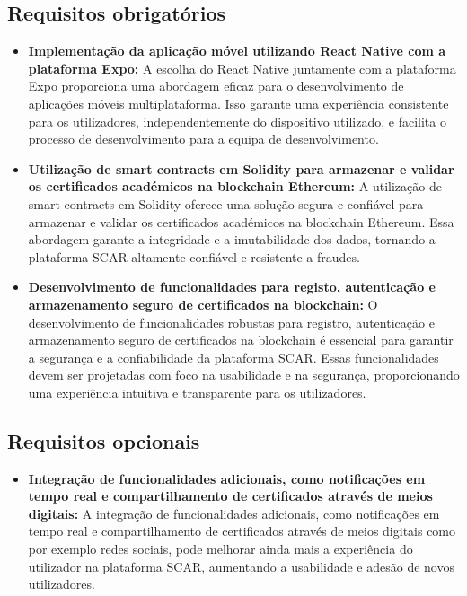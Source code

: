 \documentclass[10pt]{article}
\begin{document}
\subsection*{Requisitos obrigatórios}

\begin{itemize}

    \item\textbf{Implementação da aplicação móvel utilizando React Native com a plataforma Expo:} A escolha do React Native
          juntamente com a plataforma Expo proporciona uma abordagem eficaz para o desenvolvimento de aplicações móveis
          multiplataforma. Isso garante uma experiência consistente para os utilizadores, independentemente do dispositivo
          utilizado, e facilita o processo de desenvolvimento para a equipa de desenvolvimento.

    \item\textbf{Utilização de smart contracts em Solidity para armazenar e validar os certificados académicos na blockchain
              Ethereum:} A utilização de smart contracts em Solidity oferece uma solução segura e confiável para armazenar
          e validar os certificados académicos na blockchain Ethereum. Essa abordagem garante a integridade e a
          imutabilidade dos dados, tornando a plataforma SCAR altamente confiável e resistente a fraudes.

    \item\textbf{Desenvolvimento de funcionalidades para registo, autenticação e armazenamento seguro de certificados na
              blockchain:} O desenvolvimento de funcionalidades robustas para registro, autenticação e armazenamento seguro
          de certificados na blockchain é essencial para garantir a segurança e a confiabilidade da plataforma SCAR.\@
          Essas funcionalidades devem ser projetadas com foco na usabilidade e na segurança, proporcionando uma
          experiência intuitiva e transparente para os utilizadores.

\end{itemize}

\subsection*{Requisitos opcionais}

\begin{itemize}

    \item\textbf{Integração de funcionalidades adicionais, como notificações em tempo real e compartilhamento de certificados
              através de meios digitais:} A integração de funcionalidades adicionais, como notificações em tempo real e
          compartilhamento de certificados através de meios digitais como por exemplo redes sociais, pode melhorar ainda mais a experiência do
          utilizador na plataforma SCAR, aumentando a usabilidade e adesão de novos utilizadores.

\end{itemize}
\end{document}
